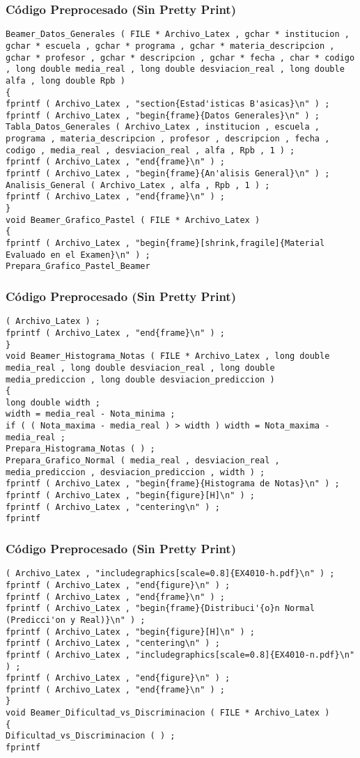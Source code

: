 \documentclass{beamer}
\begin{document}
\begin{frame}[fragile]
\frametitle{C\'odigo Preprocesado (Sin Pretty Print)}
\begin{lstlisting}[style=CStyle]
Beamer_Datos_Generales ( FILE * Archivo_Latex , gchar * institucion , gchar * escuela , gchar * programa , gchar * materia_descripcion , gchar * profesor , gchar * descripcion , gchar * fecha , char * codigo , long double media_real , long double desviacion_real , long double alfa , long double Rpb ) 
{ 
fprintf ( Archivo_Latex , "section{Estad'isticas B'asicas}\n" ) ; 
fprintf ( Archivo_Latex , "begin{frame}{Datos Generales}\n" ) ; 
Tabla_Datos_Generales ( Archivo_Latex , institucion , escuela , programa , materia_descripcion , profesor , descripcion , fecha , codigo , media_real , desviacion_real , alfa , Rpb , 1 ) ; 
fprintf ( Archivo_Latex , "end{frame}\n" ) ; 
fprintf ( Archivo_Latex , "begin{frame}{An'alisis General}\n" ) ; 
Analisis_General ( Archivo_Latex , alfa , Rpb , 1 ) ; 
fprintf ( Archivo_Latex , "end{frame}\n" ) ; 
} 
void Beamer_Grafico_Pastel ( FILE * Archivo_Latex ) 
{ 
fprintf ( Archivo_Latex , "begin{frame}[shrink,fragile]{Material Evaluado en el Examen}\n" ) ; 
Prepara_Grafico_Pastel_Beamer \end{lstlisting}
\end{frame}
\begin{frame}[fragile]
\frametitle{C\'odigo Preprocesado (Sin Pretty Print)}
\begin{lstlisting}[style=CStyle]
( Archivo_Latex ) ; 
fprintf ( Archivo_Latex , "end{frame}\n" ) ; 
} 
void Beamer_Histograma_Notas ( FILE * Archivo_Latex , long double media_real , long double desviacion_real , long double media_prediccion , long double desviacion_prediccion ) 
{ 
long double width ; 
width = media_real - Nota_minima ; 
if ( ( Nota_maxima - media_real ) > width ) width = Nota_maxima - media_real ; 
Prepara_Histograma_Notas ( ) ; 
Prepara_Grafico_Normal ( media_real , desviacion_real , media_prediccion , desviacion_prediccion , width ) ; 
fprintf ( Archivo_Latex , "begin{frame}{Histograma de Notas}\n" ) ; 
fprintf ( Archivo_Latex , "begin{figure}[H]\n" ) ; 
fprintf ( Archivo_Latex , "centering\n" ) ; 
fprintf \end{lstlisting}
\end{frame}
\begin{frame}[fragile]
\frametitle{C\'odigo Preprocesado (Sin Pretty Print)}
\begin{lstlisting}[style=CStyle]
( Archivo_Latex , "includegraphics[scale=0.8]{EX4010-h.pdf}\n" ) ; 
fprintf ( Archivo_Latex , "end{figure}\n" ) ; 
fprintf ( Archivo_Latex , "end{frame}\n" ) ; 
fprintf ( Archivo_Latex , "begin{frame}{Distribuci'{o}n Normal (Predicci'on y Real)}\n" ) ; 
fprintf ( Archivo_Latex , "begin{figure}[H]\n" ) ; 
fprintf ( Archivo_Latex , "centering\n" ) ; 
fprintf ( Archivo_Latex , "includegraphics[scale=0.8]{EX4010-n.pdf}\n" ) ; 
fprintf ( Archivo_Latex , "end{figure}\n" ) ; 
fprintf ( Archivo_Latex , "end{frame}\n" ) ; 
} 
void Beamer_Dificultad_vs_Discriminacion ( FILE * Archivo_Latex ) 
{ 
Dificultad_vs_Discriminacion ( ) ; 
fprintf \end{lstlisting}
\end{frame}
\end{document}

